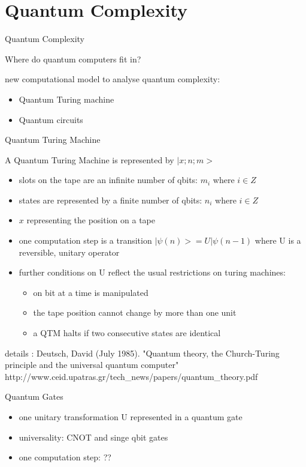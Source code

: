 \documentclass[c]{beamer}
\begin{document}
\section{Quantum Complexity}

\begin{frame}{Quantum Complexity}

Where do quantum computers fit in?

new computational model to analyse quantum complexity:
\begin{itemize}
\item Quantum Turing machine
\item Quantum circuits
\end{itemize}

\end{frame}

\begin{frame}{Quantum Turing Machine}

A Quantum Turing Machine is represented by $|x;n;m>$
\begin{itemize}
\item slots on the tape are an infinite number of qbits: $m_i$ where $i \in Z$ 
\item states are represented by a finite number of qbits: $n_i$ where $i \in Z$
\item $x$ representing the position on a tape
\item one computation step is a transition $|\psi(n)> = U|\psi(n-1)$ where
U is a reversible, unitary operator
\item further conditions on U reflect the usual restrictions on turing machines: 
\begin{itemize}
\item on bit at a time is manipulated
\item the tape position cannot change by more than one unit
\item a QTM halts if two consecutive states are identical
\end{itemize}
\end{itemize}

details : Deutsch, David (July 1985). "Quantum theory, the Church-Turing principle and the universal quantum computer"
http://www.ceid.upatras.gr/tech_news/papers/quantum_theory.pdf

\end{frame}

\begin{frame}{Quantum Gates}
\begin{itemize}
\item one unitary transformation U represented in a quantum gate
\item universality: CNOT and singe qbit gates
\item one computation step: ??
\end{itemize}
\end{frame}
\end{document}
